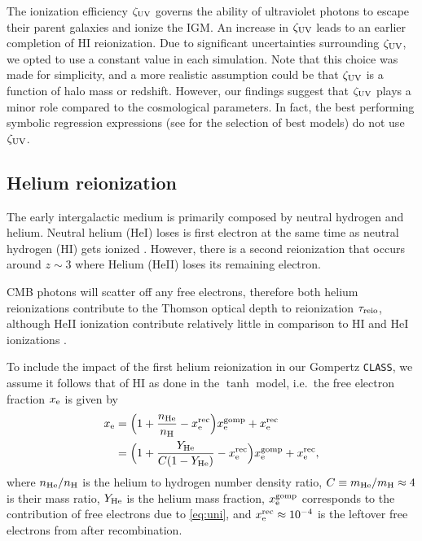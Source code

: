 The ionization efficiency $\zeta_\mathrm{UV}$ governs the ability of ultraviolet
photons to escape their parent galaxies and ionize the IGM. An increase
in $\zeta_\mathrm{UV}$ leads to an earlier completion of HI reionization.
Due to significant uncertainties surrounding $\zeta_\mathrm{UV}$, we opted to use
a constant value in each simulation.
Note that this choice was made for simplicity, and a more realistic
assumption could be that $\zeta_\mathrm{UV}$ is a function of halo mass
\cite{Park2019} or redshift.
However, our findings suggest that $\zeta_\mathrm{UV}$ plays a minor role compared
to the cosmological parameters.
In fact, the best performing symbolic regression expressions 
(see  for the selection of best models) do not use $\zeta_\mathrm{UV}$.



\subsection*{Helium reionization}
\label{ssec:helium}

The early intergalactic medium is primarily composed by neutral hydrogen
and helium.
Neutral helium (HeI) loses is first electron at the same time as neutral
hydrogen (HI) gets ionized \cite{Trac2007}.
However, there is a second reionization that occurs around $z\sim3$
where Helium (HeII) loses its remaining electron.

CMB photons will scatter off any free electrons, therefore both helium
reionizations contribute to the Thomson optical depth to reionization
$\tau_{\mathrm{reio}}$, although HeII ionization contribute relatively little in
comparison to HI and HeI ionizations \cite{Liu2016}.

To include the impact of the first helium reionization in our Gompertz
\texttt{CLASS}, we assume it follows that of HI as done in the $\tanh$
model, i.e.\ the free electron fraction $x_{\mathrm{e}}$ is given by
%
\begin{align}
\label{eq:xe_H_He}
x_\e
&= \Bigl(1 + \frac{n_\He}{n_\mathrm{H}} - x^\rec_\e\Bigr) x_\e^\gomp
  + x^\rec_\e
\nonumber\\
%
&= \Bigl(1 + \frac{Y_\He}{C (1 - Y_\He)} - x^\rec_\e\Bigr) x_\e^\gomp
  + x^\rec_\e,
\end{align}
%
where $n_{\mathrm{He}} / n_\mathrm{H}$ is the helium to hydrogen number density
ratio, $C \equiv m_{\mathrm{He}} / m_\mathrm{H} \approx 4$ is their mass ratio,
$Y_{\mathrm{He}}$ is the helium mass fraction, $x_{\mathrm{e}}^{\mathrm{gomp}}$ corresponds to the
contribution of free electrons due to \cref{eq:uni}, and $x^{\mathrm{rec}}_{\mathrm{e}}
\approx 10^{-4}$ is the leftover free electrons from after
recombination.

